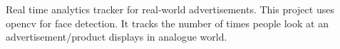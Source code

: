 
Real time analytics tracker for real-world advertisements. This project uses opencv for face detection. It tracks the number of times people look at an advertisement/product displays in analogue world.
